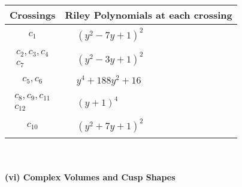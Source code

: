 \documentclass[1p]{elsarticle_modified}
\theoremstyle{definition}
\begin{document}
\begin{tabular}{m{50pt}|m{274pt}}
Crossings & \hspace{64pt}Riley Polynomials at each crossing \\
\hline $$\begin{aligned}c_{1}\end{aligned}$$&$\begin{aligned}
&(y^2-7 y+1)^2
\end{aligned}$\\
\hline $$\begin{aligned}c_{2},c_{3},c_{4}\\c_{7}\end{aligned}$$&$\begin{aligned}
&(y^2-3 y+1)^2
\end{aligned}$\\
\hline $$\begin{aligned}c_{5},c_{6}\end{aligned}$$&$\begin{aligned}
&y^4+188 y^2+16
\end{aligned}$\\
\hline $$\begin{aligned}c_{8},c_{9},c_{11}\\c_{12}\end{aligned}$$&$\begin{aligned}
&(y+1)^4
\end{aligned}$\\
\hline $$\begin{aligned}c_{10}\end{aligned}$$&$\begin{aligned}
&(y^2+7 y+1)^2
\end{aligned}$\\
\hline
\end{tabular}\\~\\
\newpage\flushleft \textbf{(vi) Complex Volumes and Cusp Shapes}
\end{document}
